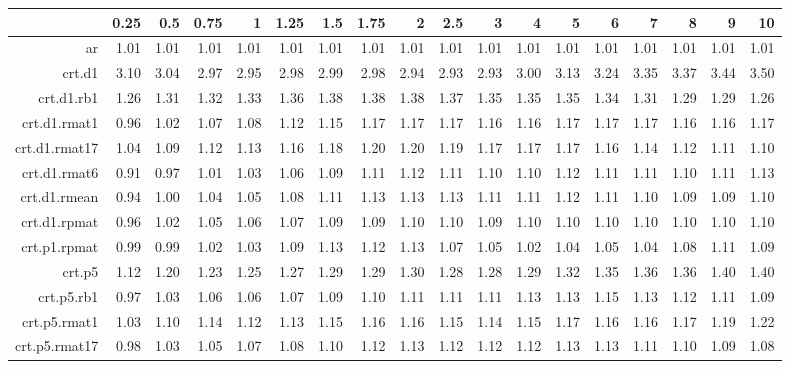\begin{tabular}{rrrrrrrrrrrrrrrrrr}
  \hline
 & 0.25 & 0.5 & 0.75 & 1 & 1.25 & 1.5 & 1.75 & 2 & 2.5 & 3 & 4 & 5 & 6 & 7 & 8 & 9 & 10 \\ 
  \hline
ar & 1.01 & 1.01 & 1.01 & 1.01 & 1.01 & 1.01 & 1.01 & 1.01 & 1.01 & 1.01 & 1.01 & 1.01 & 1.01 & 1.01 & 1.01 & 1.01 & 1.01 \\ 
  crt.d1 & 3.10 & 3.04 & 2.97 & 2.95 & 2.98 & 2.99 & 2.98 & 2.94 & 2.93 & 2.93 & 3.00 & 3.13 & 3.24 & 3.35 & 3.37 & 3.44 & 3.50 \\ 
  crt.d1.rb1 & 1.26 & 1.31 & 1.32 & 1.33 & 1.36 & 1.38 & 1.38 & 1.38 & 1.37 & 1.35 & 1.35 & 1.35 & 1.34 & 1.31 & 1.29 & 1.29 & 1.26 \\ 
  crt.d1.rmat1 & 0.96 & 1.02 & 1.07 & 1.08 & 1.12 & 1.15 & 1.17 & 1.17 & 1.17 & 1.16 & 1.16 & 1.17 & 1.17 & 1.17 & 1.16 & 1.16 & 1.17 \\ 
  crt.d1.rmat17 & 1.04 & 1.09 & 1.12 & 1.13 & 1.16 & 1.18 & 1.20 & 1.20 & 1.19 & 1.17 & 1.17 & 1.17 & 1.16 & 1.14 & 1.12 & 1.11 & 1.10 \\ 
  crt.d1.rmat6 & 0.91 & 0.97 & 1.01 & 1.03 & 1.06 & 1.09 & 1.11 & 1.12 & 1.11 & 1.10 & 1.10 & 1.12 & 1.11 & 1.11 & 1.10 & 1.11 & 1.13 \\ 
  crt.d1.rmean & 0.94 & 1.00 & 1.04 & 1.05 & 1.08 & 1.11 & 1.13 & 1.13 & 1.13 & 1.11 & 1.11 & 1.12 & 1.11 & 1.10 & 1.09 & 1.09 & 1.10 \\ 
  crt.d1.rpmat & 0.96 & 1.02 & 1.05 & 1.06 & 1.07 & 1.09 & 1.09 & 1.10 & 1.10 & 1.09 & 1.10 & 1.10 & 1.10 & 1.10 & 1.10 & 1.10 & 1.10 \\ 
  crt.p1.rpmat & 0.99 & 0.99 & 1.02 & 1.03 & 1.09 & 1.13 & 1.12 & 1.13 & 1.07 & 1.05 & 1.02 & 1.04 & 1.05 & 1.04 & 1.08 & 1.11 & 1.09 \\ 
  crt.p5 & 1.12 & 1.20 & 1.23 & 1.25 & 1.27 & 1.29 & 1.29 & 1.30 & 1.28 & 1.28 & 1.29 & 1.32 & 1.35 & 1.36 & 1.36 & 1.40 & 1.40 \\ 
  crt.p5.rb1 & 0.97 & 1.03 & 1.06 & 1.06 & 1.07 & 1.09 & 1.10 & 1.11 & 1.11 & 1.11 & 1.13 & 1.13 & 1.15 & 1.13 & 1.12 & 1.11 & 1.09 \\ 
  crt.p5.rmat1 & 1.03 & 1.10 & 1.14 & 1.12 & 1.13 & 1.15 & 1.16 & 1.16 & 1.15 & 1.14 & 1.15 & 1.17 & 1.16 & 1.16 & 1.17 & 1.19 & 1.22 \\ 
  crt.p5.rmat17 & 0.98 & 1.03 & 1.05 & 1.07 & 1.08 & 1.10 & 1.12 & 1.13 & 1.12 & 1.12 & 1.12 & 1.13 & 1.13 & 1.11 & 1.10 & 1.09 & 1.08 \\ 

\end{tabular}
